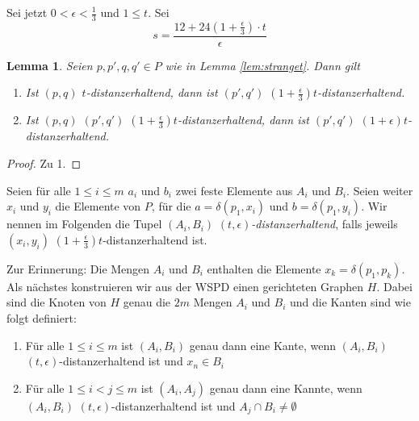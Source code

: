 \documentclass[11pt]{article}
\newtheorem{lemma}[theorem]{Lemma}
\begin{document}
    Sei jetzt $0 < \epsilon < \frac{1}{3}$ und $1 \leq t$. Sei 
    \[s = \frac{12 + 24(1 + \frac{\epsilon}{3})\cdot t}{\epsilon}\]
    
    \begin{lemma}
    	\label{lem:tepsilon}
    	Seien $p, p', q, q' \in P$ wie in Lemma \ref{lem:stranget}. Dann gilt
    	\begin{enumerate}
    		\item Ist $(p, q)$ $t$-distanzerhaltend, dann ist $(p', q')$ $(1 + \frac{\epsilon}{3})t$-distanzerhaltend.
    		\item Ist $(p, q)$ $(p', q')$ $(1 + \frac{\epsilon}{3})t$-distanzerhaltend, dann ist $(p', q')$ $(1 + \epsilon)t$-distanzerhaltend.
    	\end{enumerate}
    \end{lemma}
    \begin{proof}
    	Zu 1.
    \end{proof}
    Seien für alle $1 \leq i \leq m$ $a_i$ und $b_i$ zwei feste Elemente aus $A_i$ und $B_i$. Seien weiter $x_i$ und $y_i$ die Elemente von $P$, für die $a = \delta(p_1, x_i)$ und $b = \delta(p_1, y_i)$. Wir nennen im Folgenden die Tupel $(A_i, B_i)$ \emph{$(t, \epsilon)$-distanzerhaltend}, falls jeweils $(x_i, y_i)$ $(1 + \frac{\epsilon }{3})t$-distanzerhaltend ist.
    
    Zur Erinnerung: Die Mengen $A_i$ und $B_i$ enthalten die Elemente $x_k = \delta(p_1, p_k)$.
    Als nächstes konstruieren wir aus der WSPD einen gerichteten Graphen $H$. Dabei sind die Knoten von $H$ genau die $2m$ Mengen $A_i$ und $B_i$ und die Kanten sind wie folgt definiert:
    \begin{enumerate}
    	\item Für alle $1 \leq i \leq m$ ist $(A_i, B_i)$ genau dann eine Kante, wenn $(A_i, B_i)$ $(t, \epsilon)$-distanzerhaltend ist und $x_n \in B_i$
    	\item Für alle $1\leq i < j \leq m$ ist $(A_i, A_j)$ genau dann eine Kannte, wenn $(A_i, B_i)$ $(t, \epsilon)$-distanzerhaltend ist und $A_j \cap B_i \neq \emptyset$
    \end{enumerate}
\end{document}
